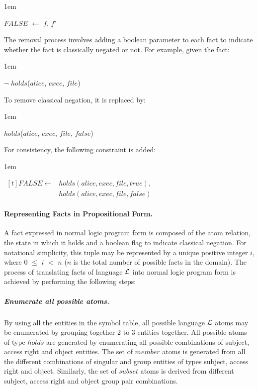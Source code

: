\documentclass[11pt, twocolumn]{article}
\newenvironment{vquote}
  {\begin{list}{}{\leftmargin 1em}\item[]}
  {\end{list}}
\begin{document}
          \begin{vquote}
            $FALSE$ $\leftarrow$ $f$, $f'$
          \end{vquote}

          The removal process involves adding a boolean parameter to each fact
          to indicate whether the fact is classically negated or not. For
          example, given the fact:

          \begin{vquote}
            $\lnot$ $holds$($alice$, $exec$, $file$)
          \end{vquote}

          To remove classical negation, it is replaced by:

          \begin{vquote}
            $holds$($alice$, $exec$, $file$, $false$)
          \end{vquote}

          For consistency, the following constraint is added:

          \begin{vquote}
            \begin{math}
              \begin{aligned}[t]
                FALSE \leftarrow & holds(alice, exec, file, true), \\
                & holds(alice, exec, file, false)
              \end{aligned}
            \end{math}
          \end{vquote}

        \paragraph{Representing Facts in Propositional Form.}

          A fact expressed in normal logic program form is composed of the
          atom relation, the state in which it holds and a boolean flag to
          indicate classical negation. For notational simplicity, this tuple
          may be represented by a unique positive integer $i$, where $0$ $\leq$
          $i$ $<$ $n$ ($n$ is the total number of possible facts in the
          domain). The process of translating facts of language ${\cal L}$
          into normal logic program form is achieved by performing the
          following steps:

          \subparagraph{Enumerate all possible atoms.}
            By using all the entities in the symbol table, all possible
            language ${\cal L}$ atoms may be enumerated by grouping together
            2 to 3 entities together. All possible atoms of type $holds$ are
            generated by enumerating all possible combinations of subject,
            access right and object entities. The set of $member$ atoms is
            generated from all the different combinations of singular and
            group entities of types subject, access right and object.
            Similarly, the set of $subset$ atoms is derived from different
            subject, access right and object group pair combinations.
\end{document}

